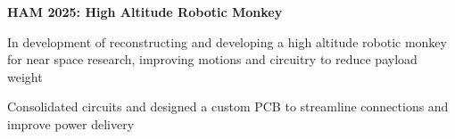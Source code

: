    \vspace{0.2 cm}

    \begin{twocolentry}{
        
    }
        \textbf{HAM 2025: High Altitude Robotic Monkey}\end{twocolentry}

    \vspace{0.10 cm}
    \begin{onecolentry}
        \begin{highlights}
            \item In development of reconstructing and developing a high altitude robotic monkey for near space research, improving motions and circuitry to reduce payload weight
            \item Consolidated circuits and designed a custom PCB to streamline connections and improve power delivery
        \end{highlights}
    \end{onecolentry}